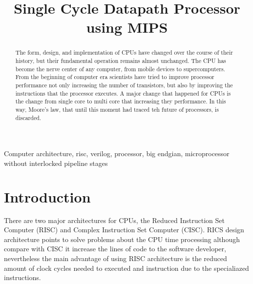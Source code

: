 \documentclass[conference]{IEEEtran}
\begin{document}
\title{Single Cycle Datapath Processor using MIPS\\
}

\author{
\and
{}
}

\maketitle

\begin{abstract}
The form, design, and implementation of CPUs have changed over the course of their history, but their
fundamental operation remains almost unchanged. The CPU has become the nerve center of any computer,
from mobile devices to supercomputers. From the beginning	of computer era scientists have tried to improve
processor performance not only increasing the number of transistors, but also by improving the instructions
that the processor executes. A major change that happened for CPUs is the change from single core to multi core
that increasing they performance. In this way, Moore's law, that until this moment had traced teh future of processors,
is discarded.
\end{abstract}

\begin{IEEEkeywords}
Computer architecture, risc, verilog, processor, big endgian, microprocessor without interlocked pipeline stages
\end{IEEEkeywords}

\section{Introduction}	%
There are two major architectures for CPUs, the Reduced Instruction Set Computer (RISC) and Complex 
Instruction Set Computer (CISC). RICS design architecture points to solve problems about the CPU time 
processing  although compare with CISC it increase the lines of code to the software developer, nevertheless 
the main advantage of using RISC architecture is the reduced amount of clock cycles needed to executed 
and instruction due to the specialiazed instructions.
\end{document}

